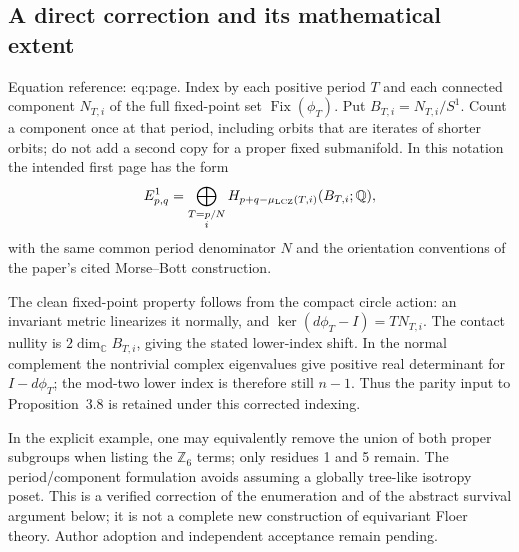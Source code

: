 \documentclass[10pt]{article}
\begin{document}
\subsection*{A direct correction and its mathematical extent}
Equation reference: eq:page. Index by each positive period \(T\) and each connected component \(N_{T,i}\) of the full fixed-point set \(\operatorname{Fix}(\phi_T)\). Put \(B_{T,i}=N_{T,i}/S^1\). Count a component once at that period, including orbits that are iterates of shorter orbits; do not add a second copy for a proper fixed submanifold. In this notation the intended first page has the form \[
 E^1_{p,q}=
 \bigoplus_{\substack{T=p/N\\i}}
 H_{p+q-\mu_{\rm LCZ}(T,i)}(B_{T,i};\mathbb Q),\] with the same common period denominator \(N\) and the orientation conventions of the paper’s cited Morse–Bott construction.\par
The clean fixed-point property follows from the compact circle action: an invariant metric linearizes it normally, and \(\ker(d\phi_T-I)=T N_{T,i}\). The contact nullity is \(2\dim_\mathbb CB_{T,i}\), giving the stated lower-index shift. In the normal complement the nontrivial complex eigenvalues give positive real determinant for \(I-d\phi_T\); the mod-two lower index is therefore still \(n-1\). Thus the parity input to Proposition 3.8 is retained under this corrected indexing.\par
In the explicit example, one may equivalently remove the union of both proper subgroups when listing the \(\mathbb Z_6\) terms; only residues 1 and 5 remain. The period/component formulation avoids assuming a globally tree-like isotropy poset. This is a verified correction of the enumeration and of the abstract survival argument below; it is not a complete new construction of equivariant Floer theory. Author adoption and independent acceptance remain pending.\par
\end{document}
